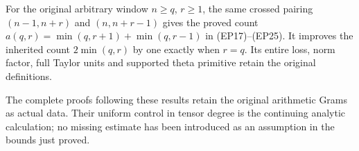 For the original arbitrary window $n\ge q$, $r\ge1$, the same
crossed pairing $(n-1,n+r)$ and $(n,n+r-1)$ gives the proved count
$a(q,r)=\min(q,r+1)+\min(q,r-1)$ in (EP17)--(EP25).
It improves the inherited count $2\min(q,r)$ by one exactly
when $r=q$. Its entire loss, norm factor, full Taylor units
and supported theta primitive retain the original definitions.

The complete proofs following these results retain the
original arithmetic Grams as actual data. Their uniform
control in tensor degree is the continuing analytic
calculation; no missing estimate has been introduced as
an assumption in the bounds just proved.
